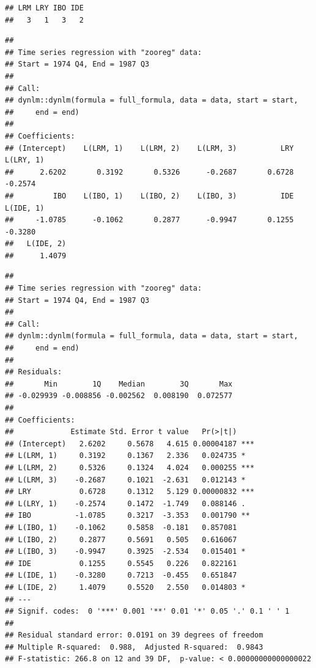 \documentclass[
]{book}
\newenvironment{Shaded}{\begin{snugshade}}{\end{snugshade}}
\newcommand{\CommentTok}[1]{\textcolor[rgb]{0.56,0.35,0.01}{\textit{#1}}}
\newcommand{\FunctionTok}[1]{\textcolor[rgb]{0.13,0.29,0.53}{\textbf{#1}}}
\newcommand{\NormalTok}[1]{#1}
\newcommand{\OtherTok}[1]{\textcolor[rgb]{0.56,0.35,0.01}{#1}}
\newcommand{\SpecialCharTok}[1]{\textcolor[rgb]{0.81,0.36,0.00}{\textbf{#1}}}
\begin{document}
\begin{verbatim}
## LRM LRY IBO IDE 
##   3   1   3   2
\end{verbatim}

\begin{Shaded}
\end{Shaded}

\begin{verbatim}
## 
## Time series regression with "zooreg" data:
## Start = 1974 Q4, End = 1987 Q3
## 
## Call:
## dynlm::dynlm(formula = full_formula, data = data, start = start, 
##     end = end)
## 
## Coefficients:
## (Intercept)    L(LRM, 1)    L(LRM, 2)    L(LRM, 3)          LRY    L(LRY, 1)  
##      2.6202       0.3192       0.5326      -0.2687       0.6728      -0.2574  
##         IBO    L(IBO, 1)    L(IBO, 2)    L(IBO, 3)          IDE    L(IDE, 1)  
##     -1.0785      -0.1062       0.2877      -0.9947       0.1255      -0.3280  
##   L(IDE, 2)  
##      1.4079
\end{verbatim}

\begin{Shaded}
\end{Shaded}

\begin{verbatim}
## 
## Time series regression with "zooreg" data:
## Start = 1974 Q4, End = 1987 Q3
## 
## Call:
## dynlm::dynlm(formula = full_formula, data = data, start = start, 
##     end = end)
## 
## Residuals:
##       Min        1Q    Median        3Q       Max 
## -0.029939 -0.008856 -0.002562  0.008190  0.072577 
## 
## Coefficients:
##             Estimate Std. Error t value   Pr(>|t|)    
## (Intercept)   2.6202     0.5678   4.615 0.00004187 ***
## L(LRM, 1)     0.3192     0.1367   2.336   0.024735 *  
## L(LRM, 2)     0.5326     0.1324   4.024   0.000255 ***
## L(LRM, 3)    -0.2687     0.1021  -2.631   0.012143 *  
## LRY           0.6728     0.1312   5.129 0.00000832 ***
## L(LRY, 1)    -0.2574     0.1472  -1.749   0.088146 .  
## IBO          -1.0785     0.3217  -3.353   0.001790 ** 
## L(IBO, 1)    -0.1062     0.5858  -0.181   0.857081    
## L(IBO, 2)     0.2877     0.5691   0.505   0.616067    
## L(IBO, 3)    -0.9947     0.3925  -2.534   0.015401 *  
## IDE           0.1255     0.5545   0.226   0.822161    
## L(IDE, 1)    -0.3280     0.7213  -0.455   0.651847    
## L(IDE, 2)     1.4079     0.5520   2.550   0.014803 *  
## ---
## Signif. codes:  0 '***' 0.001 '**' 0.01 '*' 0.05 '.' 0.1 ' ' 1
## 
## Residual standard error: 0.0191 on 39 degrees of freedom
## Multiple R-squared:  0.988,  Adjusted R-squared:  0.9843 
## F-statistic: 266.8 on 12 and 39 DF,  p-value: < 0.00000000000000022
\end{verbatim}
\end{document}
